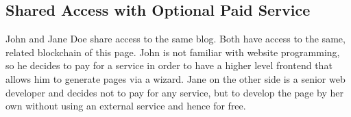 \subsection{Shared Access with Optional Paid Service}

John and Jane Doe share access to the same blog. Both have access to the same,
related blockchain of this page. John is not familiar with website
programming, so he decides to pay for a service in order to have a higher
level frontend that allows him to generate pages via a wizard. Jane on the
other side is a senior web developer and decides not to pay for any service,
but to develop the page by her own without using an external service and hence
for free.
